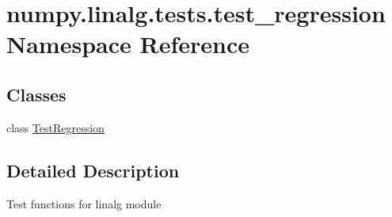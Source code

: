 \hypertarget{namespacenumpy_1_1linalg_1_1tests_1_1test__regression}{}\section{numpy.\+linalg.\+tests.\+test\+\_\+regression Namespace Reference}
\label{namespacenumpy_1_1linalg_1_1tests_1_1test__regression}
\subsection*{Classes}
\begin{DoxyCompactItemize}
\item 
class \hyperlink{classnumpy_1_1linalg_1_1tests_1_1test__regression_1_1TestRegression}{Test\+Regression}
\end{DoxyCompactItemize}


\subsection{Detailed Description}
\begin{DoxyVerb}Test functions for linalg module
\end{DoxyVerb}
 